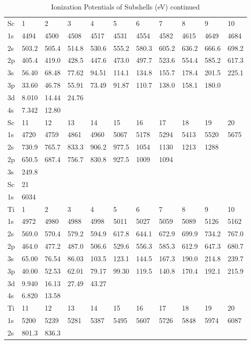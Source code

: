 \begin{table}
\caption{Ionization Potentials of Subshells (eV) continued}
\begin{tabular}{lllllllllll}
\hline
Sc&   1&   2&   3&   4&   5&   6&   7&   8&   9&  10\\
1s&  4494&  4500&  4508&  4517&  4531&
4554&  4582&  4615&  4649&  4684\\
2s& 503.2& 505.4& 514.8& 530.6& 555.2& 580.3& 605.2&
636.2& 666.6& 698.2\\
2p& 405.4& 419.0& 428.5& 447.6& 473.0& 497.7& 523.6& 554.4& 585.2&
617.3\\
3s& 56.40& 68.48& 77.62& 94.51& 114.1& 134.8& 155.7& 178.4& 201.5& 225.1\\
3p& 33.60&
46.78& 55.91& 73.49& 91.87& 110.7& 138.0& 158.1& 180.0\\
3d& 8.010& 14.44& 24.76\\
4s& 7.342&
12.80\\
\hline
Sc& 11& 12&  13&  14&  15&  16&  17&  18&  19&  20\\
\hline
1s&  4720&  4759&  4861&  4960&
5067&  5178&  5294&  5413&  5520&  5675\\
2s& 730.9& 765.7& 833.3& 906.2& 977.5& 1054&
1130& 1213& 1288\\
2p& 650.5& 687.4& 756.7& 830.8& 927.5&  1009&  1094\\
3s& 249.8\\
\hline
Sc&
21\\
\hline
1s&  6034\\
\hline
Ti&   1&   2&   3&   4&   5&   6&   7&   8&   9&  10\\
\hline
1s&  4972&  4980&  4988&
4998&  5011&  5027&  5059&  5089&  5126&  5162\\
2s& 569.0& 570.4& 579.2& 594.9& 617.8&
644.1& 672.9& 699.9& 734.2& 767.0\\
2p& 464.0& 477.2& 487.0& 506.6& 529.6& 556.3& 585.3&
612.9& 647.3& 680.7\\
3s& 65.00& 76.54& 86.03& 103.5& 123.1& 144.5& 167.3& 190.0& 214.8&
239.7\\
3p& 40.00& 52.53& 62.01& 79.17& 99.30& 119.5& 140.8& 170.4& 192.1& 215.9\\
3d&
9.940&
16.13& 27.49& 43.27\\
4s& 6.820& 13.58\\
\hline
Ti&  11&  12&  13&  14&  15&  16&  17&  18&  19&  20\\
1s&
5200&  5239&  5281&  5387&  5495&  5607&  5726&  5848&  5974&  6087\\
2s& 801.3& 836.3&

\end{tabular}
\end{table}
